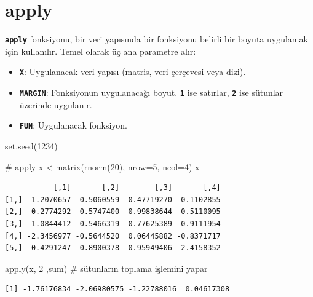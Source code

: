 \documentclass[
  letterpaper,
  DIV=11,
  numbers=noendperiod]{scrreprt}
\newenvironment{Shaded}{\begin{snugshade}}{\end{snugshade}}
\newcommand{\AttributeTok}[1]{\textcolor[rgb]{0.40,0.45,0.13}{#1}}
\newcommand{\CommentTok}[1]{\textcolor[rgb]{0.37,0.37,0.37}{#1}}
\newcommand{\DecValTok}[1]{\textcolor[rgb]{0.68,0.00,0.00}{#1}}
\newcommand{\FunctionTok}[1]{\textcolor[rgb]{0.28,0.35,0.67}{#1}}
\newcommand{\NormalTok}[1]{\textcolor[rgb]{0.00,0.23,0.31}{#1}}
\newcommand{\OtherTok}[1]{\textcolor[rgb]{0.00,0.23,0.31}{#1}}
\begin{document}
\section{apply}\label{apply}

\textbf{\texttt{apply}} fonksiyonu, bir veri yapısında bir fonksiyonu
belirli bir boyuta uygulamak için kullanılır. Temel olarak üç ana
parametre alır:

\begin{itemize}
\item
  \textbf{\texttt{X}}: Uygulanacak veri yapısı (matris, veri çerçevesi
  veya dizi).
\item
  \textbf{\texttt{MARGIN}}: Fonksiyonun uygulanacağı boyut.
  \textbf{\texttt{1}} ise satırlar, \textbf{\texttt{2}} ise sütunlar
  üzerinde uygulanır.
\item
  \textbf{\texttt{FUN}}: Uygulanacak fonksiyon.
\end{itemize}

\begin{Shaded}
\begin{Highlighting}[]
\FunctionTok{set.seed}\NormalTok{(}\DecValTok{1234}\NormalTok{)}

\CommentTok{\# apply}
\NormalTok{x }\OtherTok{\textless{}{-}}\FunctionTok{matrix}\NormalTok{(}\FunctionTok{rnorm}\NormalTok{(}\DecValTok{20}\NormalTok{), }\AttributeTok{nrow=}\DecValTok{5}\NormalTok{, }\AttributeTok{ncol=}\DecValTok{4}\NormalTok{)}
\NormalTok{x}
\end{Highlighting}
\end{Shaded}

\begin{verbatim}
           [,1]       [,2]        [,3]       [,4]
[1,] -1.2070657  0.5060559 -0.47719270 -0.1102855
[2,]  0.2774292 -0.5747400 -0.99838644 -0.5110095
[3,]  1.0844412 -0.5466319 -0.77625389 -0.9111954
[4,] -2.3456977 -0.5644520  0.06445882 -0.8371717
[5,]  0.4291247 -0.8900378  0.95949406  2.4158352
\end{verbatim}

\begin{Shaded}
\begin{Highlighting}[]
\FunctionTok{apply}\NormalTok{(x, }\DecValTok{2}\NormalTok{ ,sum) }\CommentTok{\# sütunların toplama işlemini yapar}
\end{Highlighting}
\end{Shaded}

\begin{verbatim}
[1] -1.76176834 -2.06980575 -1.22788016  0.04617308
\end{verbatim}
\end{document}
